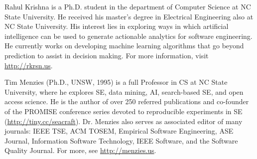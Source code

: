 \begin{IEEEbiography}
{Rahul Krishna} is a Ph.D. student in the department of Computer Science at NC State University. He received his master's degree in Electrical Engineering also at NC State University. His interest lies in exploring ways in which artificial intelligence can be used to generate actionable analytics for software engineering. He currently works on developing machine learning algorithms that go beyond prediction to assist in decision making. For more information, visit \url{http://rkrsn.us}.
\end{IEEEbiography}
\begin{IEEEbiography}
{Tim Menzies} (Ph.D., UNSW, 1995) is a full Professor in CS at NC State University, where he explores SE, data mining, AI, search-based SE, and open access science. He is the author of over 250 referred publications and co-founder of the PROMISE conference series devoted to reproducible experiments in SE (\url{http://tiny.cc/seacraft}).  Dr. Menzies also serves as associated editor of many journals:  IEEE TSE, ACM TOSEM, Empirical Software Engineering, ASE Journal, Information Software Technology, IEEE Software, and the Software Quality Journal. For more, see \url{http://menzies.us}.
\end{IEEEbiography}